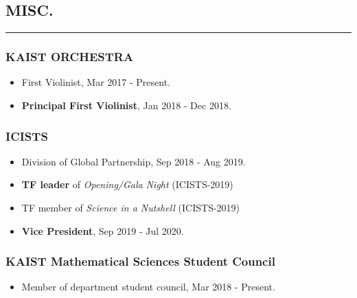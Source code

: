 \documentclass[10pt,a4]{article}
\begin{document}
\begin{small}
\subsection*{MISC.}
\hrule
\vspace{0.2cm}

\subsubsection*{KAIST ORCHESTRA}
\begin{itemize}
	\item First Violinist, Mar 2017 - Present.
	
	\item {\bf Principal First Violinist}, Jan 2018 - Dec 2018.
	
\end{itemize}

\subsubsection*{ICISTS}
\begin{itemize}
	\item Division of Global Partnership, Sep 2018 - Aug 2019.
	
	\item {\bf TF leader} of {\it Opening/Gala Night} (ICISTS-2019)
	
	\item TF member of {\it Science in a Nutshell} (ICISTS-2019)
	
	\item {\bf Vice President}, Sep 2019 - Jul 2020.
	
	
\end{itemize}

%	

\subsubsection*{KAIST Mathematical Sciences Student Council}
\begin{itemize}
	\item Member of department student council, Mar 2018 - Present.
	

\end{itemize}
\end{small}
\end{document}

